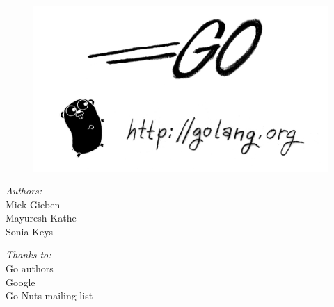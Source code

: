 \documentclass[a4paper,twoside]{blocksbook}
\begin{document}
\thispagestyle{empty}

\begin{figure}[t!]
\begin{center}
    \includegraphics[scale=0.65]{fig/bumper-inverse.png}
    {}
\end{center}
\end{figure}
\vspace*{5.0cm}
\begin{minipage}{0.4\textwidth}
\begin{flushleft} \large
\hspace*{2,0cm}\emph{Authors:}\\
\hspace*{2.0cm}Miek Gieben\\
\hspace*{2.0cm}Mayuresh Kathe\\
\hspace*{2.0cm}Sonia Keys\\
\vfill
\end{flushleft}
\end{minipage}
%
\begin{minipage}{0.4\textwidth}
\begin{flushright} \large
\emph{Thanks to:} \\
Go authors\\
Google\\
Go Nuts mailing list
\vfill
\end{flushright}
\end{minipage}

\vfill
\begin{center}
    \hspace*{1cm}\\[2.5ex]
    \hspace*{1cm}{\tiny\CcNote{\CcLongnameByNcSa}}
\newline\hspace*{1cm}{\tiny Build: \today}
\end{center}
\end{document}
